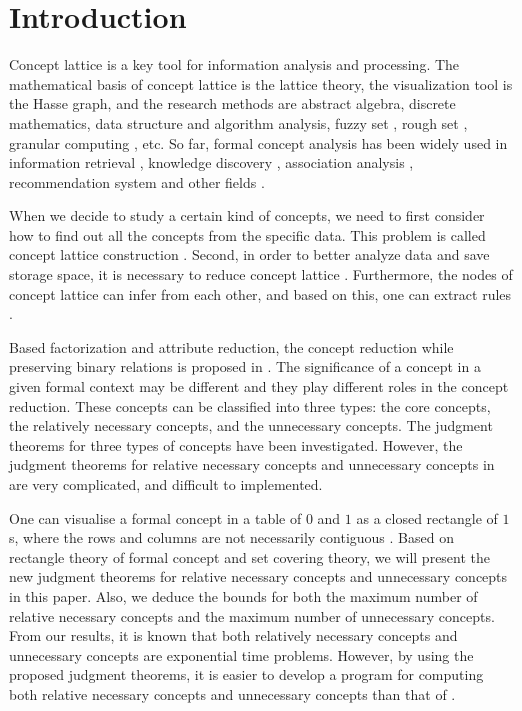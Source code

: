 \documentclass[11pt]{article}
\numberwithin{equation}{subsection}
\begin{document}
 \section{Introduction}


Concept lattice is a key  tool for information analysis and processing. The mathematical basis of concept lattice is the lattice theory, the visualization tool is the Hasse graph, and the research methods are abstract algebra, discrete mathematics, data structure and algorithm analysis, fuzzy set \cite{Zadeh}, rough set \cite{Pawlak}, granular computing \cite{Zadeh97}, etc.
So far, formal concept analysis has been widely used in information retrieval \cite{Li,Carpineto}, knowledge discovery \cite{Nguyen}, association analysis \cite{Tu}, recommendation system \cite{Zou} and other fields \cite{PIV,PBT, SYW,WW}.

When we decide to study a certain kind of concepts, we need to first consider how to find out all the concepts from the specific data. This problem is called concept lattice construction \cite{Andrews17, Outrata,  Andrews,   Osicka,  QLW, QQW}.
Second, in order to better analyze data  and save storage space, it is necessary to reduce concept lattice \cite{Cao, LMWZ, Kuznetsov2007,Ren, Wei,Zhang}.
Furthermore, the nodes of concept lattice can infer from each other, and based on this, one can extract rules \cite{Li, LML,LMW,LMWZ,PRM}.

Based factorization and attribute reduction, the concept reduction while
preserving binary relations is proposed in \cite{Cao,Wei}. The significance of a concept in a given formal context may be different and they play different roles in
the concept reduction. These concepts can be classified into three types: the core concepts, the relatively necessary concepts, and the  unnecessary
concepts.  The judgment theorems for three types of concepts have been investigated. However, the judgment theorems for relative necessary concepts and
unnecessary concepts in \cite{Cao, Wei} are very complicated, and difficult to implemented.

One can visualise a formal concept in a  table of $0$ and $1$  as a closed rectangle of $1$s, where the rows and columns  are not necessarily contiguous \cite{Andrews}.
Based on rectangle theory of formal concept and set covering theory, we will present the new judgment theorems for relative necessary concepts and
unnecessary concepts in this paper. Also, we  deduce the bounds for both the maximum number of relative necessary concepts and the maximum number of unnecessary concepts.
From our results, it is known that both relatively necessary concepts and unnecessary concepts are exponential time problems. However,
by using the proposed judgment theorems, it is easier to develop a program for computing both  relative necessary concepts and
unnecessary concepts than that of \cite{ Wei}.
\end{document}
